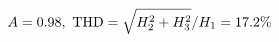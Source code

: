 \documentclass[preview]{standalone}
\begin{document}
\begin{align*}
\special{dvisvgm:raw <g id='unique000'>}A=0.98,\ \text{THD}=\sqrt{H_2^2+H_3^2}/H_1=17.2\%\special{dvisvgm:raw </g>}
\end{align*}
\end{document}
